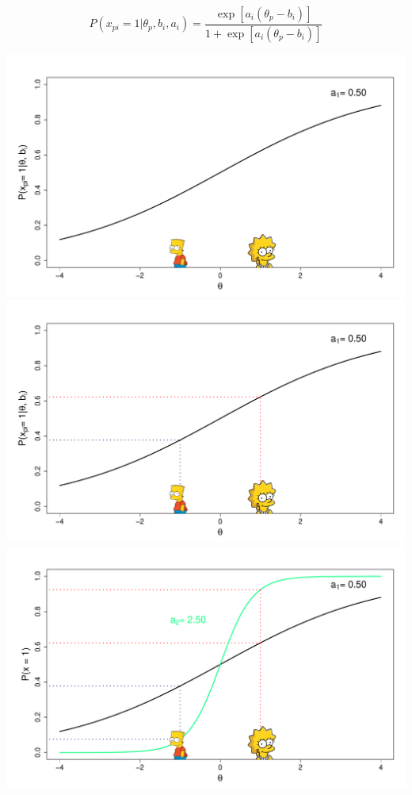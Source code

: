\documentclass[aspectratio=149, compress]{beamer}
\begin{document}
\begin{frame}
$$P(x_{pi} = 1|\theta_p, b_i, a_i) = \frac{\exp[a_i(\theta_p - b_i)]}{1 + \exp[a_i(\theta_p - b_i)]}$$


\pause

\begin{overprint}
	
	\centering
	\includegraphics[width=.75\linewidth]{img/lisa-bart-base}
	\onslide<2>
	\centering
	\includegraphics[width=.75\linewidth]{img/lisa-bart-icc}
	\onslide<3>
	\centering
	\includegraphics[width=.75\linewidth]{img/lisa-bart-icc-1}
\end{overprint}
\end{frame}
\end{document}

